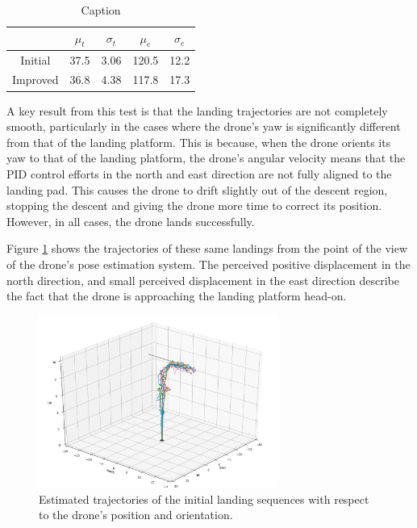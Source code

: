 \begin{table}[ht]
    \centering
    \begin{tabular}{|c|c|c|c|c|}
    \cline{2-5}
    	\multicolumn{1}{c|}{} & $\mu_t$ & $\sigma_t$ & $\mu_e$ & $\sigma_e$ \\\hline
    	Initial & 37.5 & 3.06 & 120.5 & 12.2 \\\hline
    	Improved & 36.8 & 4.38 & 117.8 & 17.3 \\\hline
    \end{tabular}
    \caption{Caption}
    \label{tab:my_label}
\end{table}

A key result from this test is that the landing trajectories are not completely smooth, particularly in the cases where the drone's yaw is significantly different from that of the landing platform. This is because, when the drone orients its yaw to that of the landing platform, the drone's angular velocity means that the PID control efforts in the north and east direction are not fully aligned to the landing pad. This causes the drone to drift slightly out of the descent region, stopping the descent and giving the drone more time to correct its position. However, in all cases, the drone lands successfully.

Figure \ref{fig:initial_landing_trajectories_estimate} shows the trajectories of these same landings from the point of the view of the drone's pose estimation system. The perceived positive displacement in the north direction, and small perceived displacement in the east direction describe the fact that the drone is approaching the landing platform head-on.

\begin{figure}[ht]
    \centering
    \includegraphics[width=0.7\textwidth]{images/initial_landing_trajectories_estimate.png}
    \caption{Estimated trajectories of the initial landing sequences with respect to the drone's position and orientation.}
    \label{fig:initial_landing_trajectories_estimate}
\end{figure}

